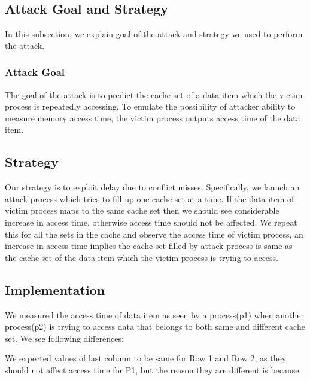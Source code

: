 \documentclass[twocolumn]{IEEEtran}
\begin{document}
\subsection {Attack Goal and Strategy}
In this subsection, we explain goal of the attack and strategy we used to perform the attack.
\subsubsection {Attack Goal}
The goal of the attack is to predict the cache set of a data item which the victim process is repeatedly accessing. To emulate the possibility of attacker ability to measure memory access time, the victim process outputs access time of the data item.
\subsection {Strategy}
Our strategy is to exploit delay due to conflict misses. Specifically, we launch an attack process which tries to fill up one cache set at a time. If the data item of victim process maps to the same cache set then we should see considerable increase in access time, otherwise access time should not be affected. We repeat this for all the sets in the cache and observe the access time of victim process, an increase in access time implies the cache set filled by attack process is same as the cache set of the data item which the victim process is trying to access.
\subsection {Implementation}
We measured the access time of data item as seen by a process(p1) when another process(p2) is trying to access data that belongs to both same and different cache set. We see following differences:
\begin{center}
\end{center}
We expected values of last column to be same for Row 1 and Row 2, as they should not affect access time for P1, but the reason they are different is because 
\end{document}
